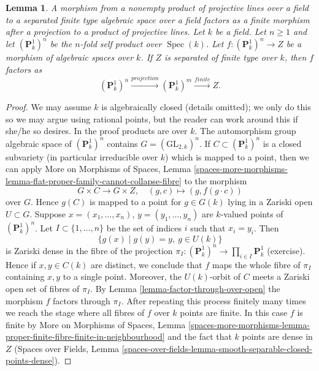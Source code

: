 \documentclass{stacks-project}
\newenvironment{slogan}{\comment}{\endcomment}
\theoremstyle{plain}
\newtheorem{lemma}[subsection]{Lemma}
\theoremstyle{definition}
\theoremstyle{remark}
\numberwithin{equation}{subsection}
\def\Spec{\mathop{\mathrm{Spec}}}
\begin{document}
\begin{lemma}
\label{lemma-quotient-power-P1}
\begin{slogan}
A morphism from a nonempty product of projective lines over a field to
a separated finite type algebraic space over a field factors as a
finite morphism after a projection to a product of projective lines.
\end{slogan}
Let $k$ be a field. Let $n \geq 1$ and let $(\mathbf{P}^1_k)^n$
be the $n$-fold self product over $\Spec(k)$. Let
$f : (\mathbf{P}^1_k)^n \to Z$ be a morphism of algebraic spaces over $k$.
If $Z$ is separated of finite type over $k$, then $f$ factors as
$$
(\mathbf{P}^1_k)^n \xrightarrow{projection}
(\mathbf{P}^1_k)^m \xrightarrow{finite} Z.
$$
\end{lemma}

\begin{proof}
We may assume $k$ is algebraically closed (details omitted); we only
do this so we may argue using rational points, but the reader can work
around this if she/he so desires. In the proof products are over $k$.
The automorphism group algebraic space of $(\mathbf{P}^1_k)^n$ contains
$G = (\text{GL}_{2, k})^n$. If $C \subset (\mathbf{P}^1_k)^n$ is a
closed subvariety (in particular irreducible over $k$) which is mapped
to a point, then we can apply
More on Morphisms of Spaces,
Lemma \ref{spaces-more-morphisms-lemma-flat-proper-family-cannot-collapse-fibre}
to the morphism
$$
G \times C \to G \times Z,\quad (g, c) \mapsto (g, f(g \cdot c))
$$
over $G$. Hence $g(C)$ is mapped to a point for $g \in G(k)$
lying in a Zariski open $U \subset G$. Suppose
$x = (x_1, \ldots, x_n)$, $y = (y_1, \ldots, y_n)$
are $k$-valued points of $(\mathbf{P}^1_k)^n$. Let
$I \subset \{1, \ldots, n\}$ be the set of indices $i$
such that $x_i = y_i$. Then
$$
\{g(x) \mid g(y) = y,\ g \in U(k)\}
$$
is Zariski dense in the fibre of the projection
$\pi_I : (\mathbf{P}^1_k)^n \to \prod_{i \in I} \mathbf{P}^1_k$
(exercise). Hence if $x, y \in C(k)$ are distinct, we conclude
that $f$ maps the whole fibre of $\pi_I$ containing $x, y$ to a
single point. Moreover, the $U(k)$-orbit of $C$ meets a Zariski
open set of fibres of $\pi_I$. By Lemma \ref{lemma-factor-through-over-open}
the morphism $f$ factors through $\pi_I$.
After repeating this process finitely many times we reach
the stage where all fibres of $f$ over $k$ points are finite.
In this case $f$ is finite by
More on Morphisms of Spaces, Lemma
\ref{spaces-more-morphisms-lemma-proper-finite-fibre-finite-in-neighbourhood}
and the fact that $k$ points are dense in $Z$
(Spaces over Fields, Lemma
\ref{spaces-over-fields-lemma-smooth-separable-closed-points-dense}).
\end{proof}
\end{document}
